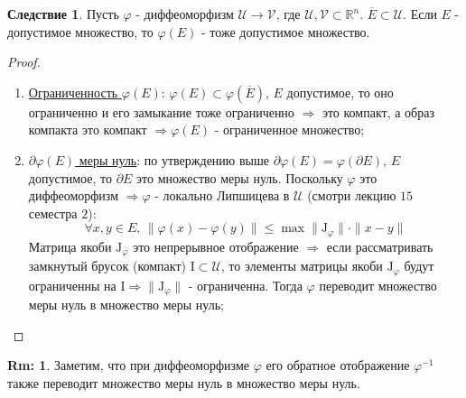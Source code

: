 \documentclass[12pt]{article}
\newcommand{\MR}{\mathbb{R}}
\newcommand{\MI}{\mathrm{I}}
\newcommand{\MJ}{\mathrm{J}}
\newcommand{\MU}{\mathcal{U}}
\newcommand{\MV}{\mathcal{V}}
\theoremstyle{definition}
\newtheorem{rem}{Rm:}
\newtheorem{corollary}{Следствие}
\newcommand{\ovl}[1]{\overline{#1}}
\begin{document}
\begin{corollary}
	Пусть $\varphi$ - диффеоморфизм $\MU \to \MV$, где $\MU, \MV \subset \MR^n$. $\ovl{E} \subset \MU$. Если $E$ - допустимое множество, то $\varphi(E)$ - тоже допустимое множество.
\end{corollary}
\begin{proof}\hfill
	\begin{enumerate}[label=\arabic*)]
		\item \uline{Ограниченность $\varphi(E)$}: $\varphi(E) \subset \varphi(\ovl{E})$, $E$ допустимое, то оно ограниченно и его замыкание тоже ограниченно $\Rightarrow$ это компакт, а образ компакта это компакт $\Rightarrow \varphi(E)$ - ограниченное множество;
		\item \uline{$\partial \varphi(E)$ меры нуль}: по утверждению выше $\partial \varphi(E) = \varphi(\partial E)$, $E$ допустимое, то $\partial E$ это множество меры нуль. Поскольку $\varphi$ это диффеоморфизм $\Rightarrow \varphi$ - локально Липшицева в $\MU$ (смотри лекцию $15$ семестра $2$):
		$$
			\forall x,y \in E, \,  \|\varphi(x) - \varphi(y)\| \leq \max\|\MJ_\varphi\|{\cdot}\|x - y\|
		$$
		Матрица якоби $\MJ_\varphi$ это непрерывное отображение $\Rightarrow$ если рассматривать замкнутый брусок (компакт) $\MI \subset \MU$, то элементы матрицы якоби $\MJ_\varphi$ будут ограниченны на $\MI \Rightarrow \|\MJ_\varphi\|$ - ограниченна. Тогда $\varphi$ переводит множество меры нуль в множество меры нуль;
	\end{enumerate}	
\end{proof}
\begin{rem}
	Заметим, что при диффеоморфизме $\varphi$ его обратное отображение $\varphi^{-1}$ также переводит множество меры нуль в множество меры нуль.
\end{rem}
\newpage
\end{document}
